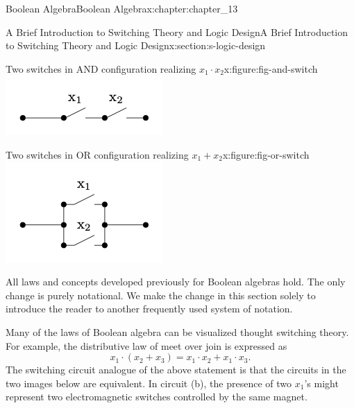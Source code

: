 \documentclass[twoside,10pt,]{book}
\numberwithin{equation}{section}
\begin{document}
\begin{chapterptx}{Boolean Algebra}{}{Boolean Algebra}{}{}{x:chapter:chapter_13}
\begin{sectionptx}{A Brief Introduction to Switching Theory and Logic Design}{}{A Brief Introduction to Switching Theory and Logic Design}{}{}{x:section:s-logic-design}
\begin{sidebyside}{2}{0}{0}{0}
\begin{sbspanel}{0.5}
\begin{figureptx}{Two switches in AND configuration realizing \(x_1 \cdot x_2\)}{x:figure:fig-and-switch}{}
\includegraphics[width=\linewidth]{images/fig-and-switch.png}
\tcblower
\end{figureptx}%
\end{sbspanel}%
\begin{sbspanel}{0.5}%
\begin{figureptx}{Two switches in OR configuration realizing \(x_1 + x_2\)}{x:figure:fig-or-switch}{}%
\includegraphics[width=\linewidth]{images/fig-or-switch.png}
\tcblower
\end{figureptx}%
\end{sbspanel}%
\end{sidebyside}%
\par
All laws and concepts developed previously for Boolean algebras hold. The only change is purely notational. We make the change in this section solely to introduce the reader to another frequently used system of notation.%
\par
Many of the laws of Boolean algebra can be visualized thought switching theory. For example, the distributive law of meet over join is expressed as%
\begin{equation*}
x_1 \cdot \left(x_2+ x_3\right) = x_1 \cdot  x_2+x_1 \cdot  x_3.
\end{equation*}
The switching circuit analogue of the above statement is that the circuits in the two images below are equivalent.  In circuit (b), the presence of two \(x_1\)'s might represent two electromagnetic switches controlled by the same magnet.%

\end{sectionptx}
\end{chapterptx}
\end{document}
